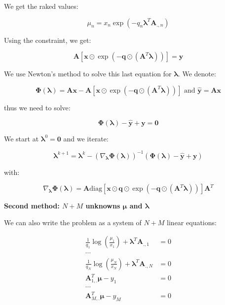 \documentclass{tex/note}
\begin{document}
We get the raked values:

\begin{equation*}
\mu_n = x_n \exp \left( - q_n \bm{\lambda}^T \bm{A}_{.,n} \right)
\end{equation*}

Using the constraint, we get:

\begin{equation*}
\bm{A} \left[ \bm{x} \odot \exp \left( - \bm{q} \odot \left( \bm{A}^T \bm{\lambda} \right) \right) \right] = \bm{y}
\end{equation*}

We use Newton’s method to solve this last equation for $\bm{\lambda}$. We denote:

\begin{equation*}
\bm{\Phi} \left( \bm{\lambda} \right) = \bm{A} \bm{x} - \bm{A} \left[ \bm{x} \odot \exp \left( - \bm{q} \odot \left( \bm{A}^T \bm{\lambda} \right) \right) \right] \text{ and } \hat{\bm{y}} = \bm{A} \bm{x}
\end{equation*}

thus we need to solve:

\begin{equation*}
\bm{\Phi} \left( \bm{\lambda} \right) - \hat{\bm{y}} + \bm{y} = \bm{0}
\end{equation*}

We start at $\bm{\lambda}^0 = \bm{0}$ and we iterate:

\begin{equation*}
\bm{\lambda}^{k + 1} = \bm{\lambda}^k - \left( \nabla_{\bm{\lambda}} \bm{\Phi} \left( \bm{\lambda} \right) \right) ^{-1} \left( \bm{\Phi} \left( \bm{\lambda} \right) - \hat{\bm{y}} + \bm{y} \right)
\end{equation*}

with:

\begin{equation*}
\nabla_{\bm{\lambda}} \bm{\Phi} \left( \bm{\lambda} \right) = \bm{A} \text{diag} \left[ \bm{x} \odot \bm{q} \odot \exp \left( - \bm{q} \odot \left( \bm{A}^T \bm{\lambda} \right) \right) \right] \bm{A}^T
\end{equation*}

\textbf{Second method: $N + M$ unknowns $\bm{\mu}$ and $\bm{\lambda}$}

We can also write the problem as a system of $N + M$ linear equations:

\begin{align*}
\frac{1}{q_1} \log \left( \frac{\mu_1}{x_1} \right) + \bm{\lambda}^T \bm{A}_{.,1} &= 0 \\
\cdots & \\
\frac{1}{q_N} \log \left( \frac{\mu_N}{x_N} \right) + \bm{\lambda}^T \bm{A}_{.,N} &= 0 \\
\bm{A}_{1,.}^T \bm{\mu} - y_1 &= 0 \\
\cdots & \\
\bm{A}_{M,.}^T \bm{\mu} - y_M &= 0
\end{align*}
\end{document}
